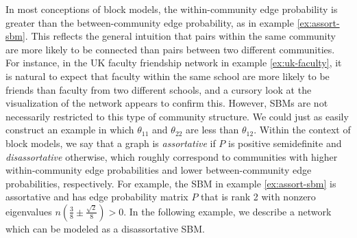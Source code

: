 \documentclass[
  12pt,
]{article}
\theoremstyle{definition}
\theoremstyle{definition}
\theoremstyle{definition}
\theoremstyle{definition}
\theoremstyle{remark}
\begin{document}
In most conceptions of block models, the within-community edge probability is greater than the between-community edge probability, as in example \ref{ex:assort-sbm}.
This reflects the general intuition that pairs within the same community are more likely to be connected than pairs between two different communities.
For instance, in the UK faculty friendship network in example \ref{ex:uk-faculty}, it is natural to expect that faculty within the same school are more likely to be friends than faculty from two different schools, and a cursory look at the visualization of the network appears to confirm this.
However, SBMs are not necessarily restricted to this type of community structure.
We could just as easily construct an example in which \(\theta_{11}\) and \(\theta_{22}\) are less than \(\theta_{12}\).
Within the context of block models, we say that a graph is \emph{assortative} if \(P\) is positive semidefinite and \emph{disassortative} otherwise, which roughly correspond to communities with higher within-community edge probabilities and lower between-community edge probabilities, respectively.
For example, the SBM in example \ref{ex:assort-sbm} is assortative and has edge probability matrix \(P\) that is rank 2 with nonzero eigenvalues \(n (\frac{3}{8} \pm \frac{\sqrt{2}}{8}) > 0\).
In the following example, we describe a network which can be modeled as a disassortative SBM.
\end{document}
